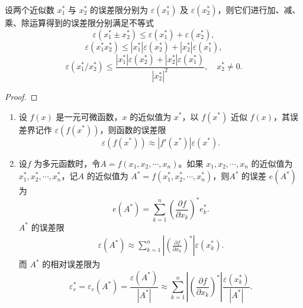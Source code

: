 \documentclass[../../main.tex]{subfiles}
\begin{document}
\begin{theorem}
设两个近似数 $x_1^*$ 与 $x_2^*$ 的误差限分别为 $\varepsilon(x_1^*)$ 及 $\varepsilon(x_2^*)$，则它们进行加、减、乘、除运算得到的误差限分别满足不等式 
\[
\varepsilon(x_1^* \pm x_2^*) \leqslant \varepsilon(x_1^*) + \varepsilon(x_2^*),
\]
\[
\varepsilon(x_1^* x_2^*) \leqslant | x_1^* | \varepsilon(x_2^*) + | x_2^* | \varepsilon(x_1^*),
\]
\[
\varepsilon(x_1^* / x_2^*) \leqslant \frac{| x_1^* | \varepsilon(x_2^*) + | x_2^* | \varepsilon(x_1^*)}{| x_2^* |^2}, \quad x_2^* \neq 0.
\]
\end{theorem}
\begin{proof}


\end{proof}

\begin{theorem}
\begin{enumerate}
\item 设 $f(x)$ 是一元可微函数，$x$ 的近似值为 $x^*$，以 $f(x^*)$ 近似 $f(x)$，其误差界记作 $\varepsilon(f(x^*))$，则函数的误差限 
\[
\varepsilon(f(x^*)) \approx | f'(x^*) | \varepsilon(x^*).
\]

\item 设$f$ 为多元函数时，令$A = f(x_1, x_2, \cdots, x_n)$。如果 $x_1, x_2, \cdots, x_n$ 的近似值为 $x_1^*, x_2^*, \cdots, x_n^*$，记$A$ 的近似值为 $A^* = f(x_1^*, x_2^*, \cdots, x_n^*)$，则$A^*$ 的误差 $e(A^*)$ 为 
\[
e(A^*) =\sum_{k=1}^n \left( \frac{\partial f}{\partial x_k} \right)^* e_k^*.
\]
$A^*$ 的误差限 
\begin{align}
\varepsilon(A^*) \approx \sum_{k=1}^n \left| \left( \frac{\partial f}{\partial x_k} \right)^* \right| \varepsilon(x_k^*) .\label{eq:::---20...3}
\end{align}
而 $A^*$ 的相对误差限为 
\[
\varepsilon_r^* = \varepsilon_r(A^*) = \frac{\varepsilon(A^*)}{| A^* |} \approx \sum_{k=1}^n \left| \left( \frac{\partial f}{\partial x_k} \right)^* \right| \frac{\varepsilon(x_k^*)}{| A^* |} .
\]
\end{enumerate}
\end{theorem}
\end{document}
